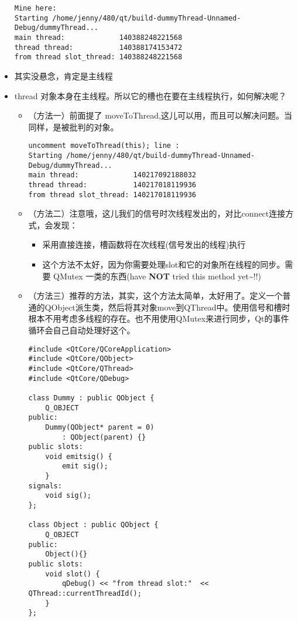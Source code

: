 \documentclass[9pt,b5paper]{article}
\begin{document}
\begin{itemize}
\begin{lstlisting}
Mine here: 
Starting /home/jenny/480/qt/build-dummyThread-Unnamed-Debug/dummyThread...
main thread:             140388248221568 
thread thread:           140388174153472 
from thread slot_thread: 140388248221568
\end{lstlisting}
\item 其实没悬念，肯定是主线程
\item thread 对象本身在主线程。所以它的槽也在要在主线程执行，如何解决呢？
\begin{itemize}
\item （方法一）前面提了 moveToThread,这儿可以用，而且可以解决问题。当同样，是被批判的对象。
\lstset{language=java,label= ,caption= ,numbers=none}
\begin{lstlisting}
uncomment moveToThread(this); line :
Starting /home/jenny/480/qt/build-dummyThread-Unnamed-Debug/dummyThread...
main thread:             140217092188032 
thread thread:           140217018119936 
from thread slot_thread: 140217018119936
\end{lstlisting}
\item （方法二）注意哦，这儿我们的信号时次线程发出的，对比connect连接方式，会发现：
\begin{itemize}
\item 采用直接连接，槽函数将在次线程(信号发出的线程)执行
\item 这个方法不太好，因为你需要处理slot和它的对象所在线程的同步。需要 QMutex 一类的东西(have \textbf{NOT} tried this method yet\textasciitilde{}!!)
\end{itemize}
\item （方法三）推荐的方法，其实，这个方法太简单，太好用了。定义一个普通的QObject派生类，然后将其对象move到QThread中。使用信号和槽时根本不用考虑多线程的存在。也不用使用QMutex来进行同步，Qt的事件循环会自己自动处理好这个。
\lstset{language=java,label= ,caption= ,numbers=none}
\begin{lstlisting}
#include <QtCore/QCoreApplication>   
#include <QtCore/QObject>   
#include <QtCore/QThread>   
#include <QtCore/QDebug>    

class Dummy : public QObject {       
    Q_OBJECT   
public:
    Dummy(QObject* parent = 0)
        : QObject(parent) {}   
public slots:
    void emitsig() {
        emit sig();       
    }
signals:
    void sig();
};

class Object : public QObject {       
    Q_OBJECT   
public:
    Object(){}
public slots:
    void slot() {    
        qDebug() << "from thread slot:"  << QThread::currentThreadId();       
    }   
};    


\end{lstlisting}
\end{itemize}
\end{itemize}
\end{document}

